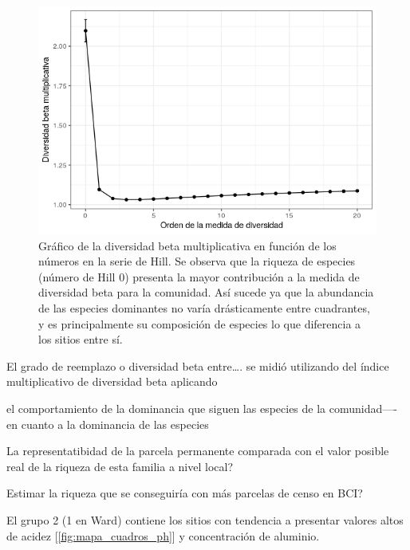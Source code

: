 \documentclass[11pt,]{article}
\begin{document}
\begin{figure}
\centering
\includegraphics{grafico_divrsdad_beta_hill.png}
\caption{Gráfico de la diversidad beta multiplicativa en función de los
números en la serie de Hill. Se observa que la riqueza de especies
(número de Hill 0) presenta la mayor contribución a la medida de
diversidad beta para la comunidad. Así sucede ya que la abundancia de
las especies dominantes no varía drásticamente entre cuadrantes, y es
principalmente su composición de especies lo que diferencia a los sitios
entre sí. \label{fig:grafico_divrsdad_beta_hill}}
\end{figure}

El grado de reemplazo o diversidad beta entre\ldots{}. se midió
utilizando del índice multiplicativo de diversidad beta aplicando

el comportamiento de la dominancia que siguen las especies de la
comunidad---- en cuanto a la dominancia de las especies

La representatibidad de la parcela permanente comparada con el valor
posible real de la riqueza de esta familia a nivel local?

Estimar la riqueza que se conseguiría con más parcelas de censo en BCI?

El grupo 2 (1 en Ward) contiene los sitios con tendencia a presentar
valores altos de acidez {[}\ref{fig:mapa_cuadros_ph}{]} y concentración
de aluminio.
\end{document}
